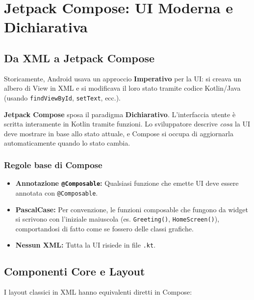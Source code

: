 
\chapter{Jetpack Compose: UI Moderna e Dichiarativa}

\section{Da XML a Jetpack Compose}
Storicamente, Android usava un approccio \textbf{Imperativo} per la UI: si creava un albero di View in XML e si modificava il loro stato tramite codice Kotlin/Java (usando \texttt{findViewById}, \texttt{setText}, ecc.).

\textbf{Jetpack Compose} sposa il paradigma \textbf{Dichiarativo}.
L'interfaccia utente è scritta interamente in Kotlin tramite funzioni. Lo sviluppatore descrive \textit{cosa} la UI deve mostrare in base allo stato attuale, e Compose si occupa di aggiornarla automaticamente quando lo stato cambia.

\subsection{Regole base di Compose}
\begin{itemize}
    \item \textbf{Annotazione \texttt{@Composable}:} Qualsiasi funzione che emette UI deve essere annotata con \texttt{@Composable}.
    \item \textbf{PascalCase:} Per convenzione, le funzioni composable che fungono da widget si scrivono con l'iniziale maiuscola (es. \texttt{Greeting()}, \texttt{HomeScreen()}), comportandosi di fatto come se fossero delle classi grafiche.
    \item \textbf{Nessun XML:} Tutta la UI risiede in file \texttt{.kt}.
\end{itemize}

\section{Componenti Core e Layout}
I layout classici in XML hanno equivalenti diretti in Compose:


